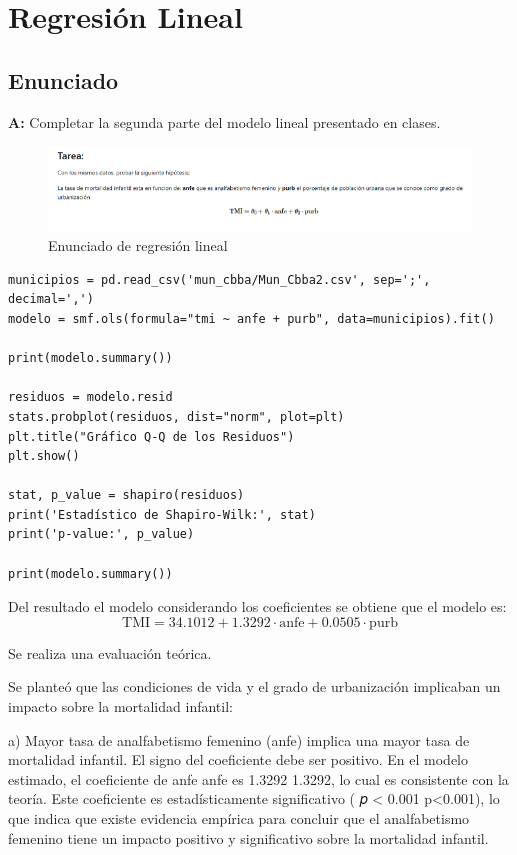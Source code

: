 \newpage
\section{Regresión Lineal}
\subsection{Enunciado}
\textbf{A:} Completar la segunda parte del modelo lineal presentado en clases.
\begin{figure}[h!]
    \centering
    \includegraphics[width=1\textwidth]{images/statement.png}
    \caption{Enunciado de regresión lineal}
    \label{fig:regresion_lineal_statement}
\end{figure}

\begin{verbatim}
municipios = pd.read_csv('mun_cbba/Mun_Cbba2.csv', sep=';', decimal=',')
modelo = smf.ols(formula="tmi ~ anfe + purb", data=municipios).fit()

print(modelo.summary())

residuos = modelo.resid
stats.probplot(residuos, dist="norm", plot=plt)
plt.title("Gráfico Q-Q de los Residuos")
plt.show()

stat, p_value = shapiro(residuos)
print('Estadístico de Shapiro-Wilk:', stat)
print('p-value:', p_value)

print(modelo.summary())
\end{verbatim}

Del resultado el modelo considerando los coeficientes se obtiene que el modelo es:
$$
\text{TMI} = 34.1012 + 1.3292 \cdot \text{anfe} + 0.0505 \cdot \text{purb}
$$



Se realiza una evaluación teórica.

Se planteó que las condiciones de vida y el grado de urbanización implicaban un impacto sobre la mortalidad infantil:

a) Mayor tasa de analfabetismo femenino (anfe) implica una mayor tasa de mortalidad infantil. El signo del coeficiente debe ser positivo. En el modelo estimado, el coeficiente de anfe anfe es  1.3292 1.3292, lo cual es consistente con la teoría. Este coeficiente es estadísticamente significativo ( 𝑝 < 0.001 p<0.001), lo que indica que existe evidencia empírica para concluir que el analfabetismo femenino tiene un impacto positivo y significativo sobre la mortalidad infantil.

